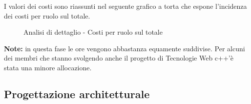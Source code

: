 			\noindent
			I valori dei costi sono riassunti nel seguente grafico a torta che espone l’incidenza dei costi per ruolo sul totale.
			\begin{center}
				\begin{figure}[htbp]
				\vspace{0.8cm}
				\caption{Analisi di dettaglio - Costi per ruolo sul totale}
				\end{figure}
			\end{center}
		\noindent
		\textbf{Note:} in questa fase le ore vengono abbastanza equamente suddivise. Per alcuni dei membri che stanno svolgendo anche il progetto di Tecnologie Web c++\gloss{}'è stata una minore allocazione.
	
	\newpage
	\subsection{Progettazione architetturale} %
	\label{sub:progettazione_architetturale}

